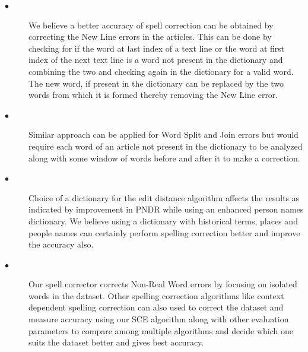 \documentclass[12pt]{article}
\begin{document}
\begin{description}
\item[$\bullet$]\noindent
We believe a better accuracy of spell correction can be obtained by correcting the New Line errors in the articles. This can be done by checking for if the word at last index of a text line or the word at first index of the next text line is a word not present in the dictionary and combining the two and checking again in the dictionary for a valid word. The new word, if present in the dictionary can be replaced by the two words from which it is formed thereby removing the New Line error. 
\item[$\bullet$]\noindent Similar approach can be applied for Word Split and Join errors but would require each word of an article not present in the dictionary to be analyzed along with some window of words before and after it to make a correction. 
\item[$\bullet$]\noindent Choice of a dictionary for the edit distance algorithm affects the results as indicated by improvement in PNDR while using an enhanced person names dictionary. We believe using a dictionary with historical terms, places and people names can certainly perform spelling correction better and improve the accuracy also.
\item[$\bullet$] \noindent 
Our spell corrector corrects Non-Real Word errors by focusing on isolated words in the dataset. Other spelling correction algorithms like context dependent spelling correction can also used to correct the dataset and measure accuracy using our SCE algorithm along with other evaluation parameters to compare among multiple algorithms and decide which one suits the dataset better and gives best accuracy. 
\end{description}

\end{document}
